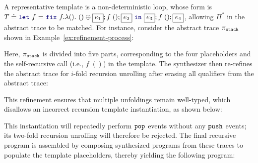 \begin{example}
  A representative template is a non-deterministic loop, whose form is
  $T \doteq \zlet{f}{\mykw{fix}\ f.\lambda ().\ () \oplus \boxed{e_1};
    f\;(); \boxed{e_2}}{\boxed{e_3};f\;();\boxed{e_4}}$, allowing
  $\Pi^*$ in the abstract trace to be matched. For instance, consider
  the abstract trace $\pi_{\tt stack}$ shown in
  Example~\ref{ex:refinement-process}: %
  \vspace{-.4cm} \par{}\noindent
  Here, $\pi_{\tt stack}$ is divided into five parts, corresponding
  to the four placeholders and the self-recursive call (i.e., $f\;()$)
  in the template. The synthesizer then re-refines the abstract trace for $i$-fold
  recursion unrolling after erasing all qualifiers from the abstract
  trace: %
  \vspace{-.4cm} \par{}\noindent
  This refinement ensures that multiple unfoldings remain well-typed,
  which disallows an incorrect recursion template instantiation, as
  shown below: %
  \vspace{-.4cm} \par{} %
  \noindent This instantiation will repeatedly perform $\boldsymbol{{\tt pop}}$
  events without any $\boldsymbol{{\tt push}}$ events; its two-fold recursion
  unrolling will therefore be rejected.  The final recursive program
  is assembled by composing synthesized programs from these traces to
  populate the template placeholders, thereby yielding the following
  program:


\end{example}
